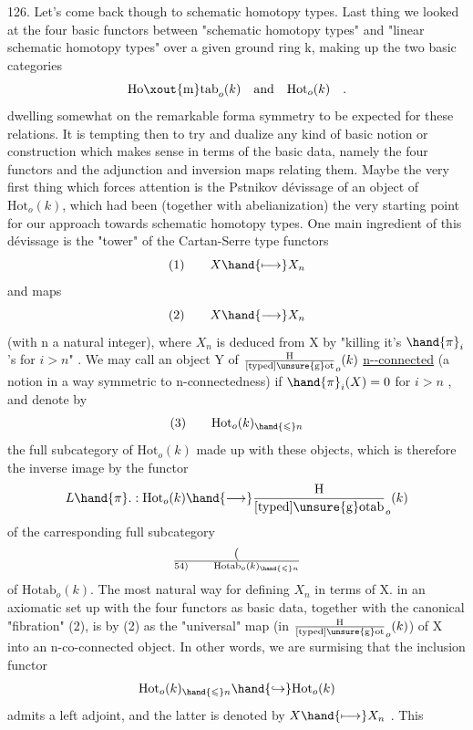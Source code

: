  

126.      Let's come back though to schematic homotopy types.  Last thing
we looked at  the four basic functors between "schematic homotopy
types"  and "linear schematic homotopy types" over a given ground ring k,
making up the two basic categories
\[ \mathrm{Ho\xout{m}tab}_o(k) \quad \text{and} \quad \mathrm{Hot}_o(k) \quad . \]
 dwelling somewhat on the remarkable forma symmetry to be expected
for these relations.  It  is tempting then to try and dualize any
kind of basic notion or construction which makes sense in terms of the
basic data,  namely the four functors and the adjunction and inversion
maps relating them.  Maybe the very first thing which forces attention
is the Pstnikov  dévissage of an object of $\mathrm{Hot}_o(k)$,  which
had been (together with abelianization) the very starting point for our
approach towards schematic homotopy types.   One main ingredient of this
dévissage is the "tower" of the Cartan-Serre type functors
\[ (1) \qquad X \hand{\longmapsto} X_n \]
and maps
\[ (2) \qquad X \hand{\longrightarrow} X_n \]
(with n a natural integer),  where $X_n$ is deduced from X by "killing it's
$\hand{\pi}_i$'s  for  $i > n$" .  We may  call an object Y of $\mathrm{H\over[typed]{\unsure{g}}{o}t}_o(k)$
\uline{n-}\uline{-connected}  (a notion in a way  symmetric to n-connectedness)
if  $\hand{\pi}_i(X) = 0$  for  $i > n$ ,  and denote by
\[ (3) \qquad \mathrm{Hot}_o(k)_{\hand{\leqslant} n} \]
the full subcategory of $\mathrm{Hot}_o(k)$ made up with these objects,  which is
therefore the inverse image by the functor
\[ L\hand{\pi}. : \mathrm{Hot}_o(k) \hand{\longrightarrow} \mathrm{H\over[typed]{\unsure{g}}{o}tab}_o(k) \]
of the carresponding full subcategory
\[ (\over{5}{4}) \qquad \mathrm{Hotab}_o(k)_{\hand{\leqslant} n} \]
of $\mathrm{Hotab}_o(k)$.  The most natural way for defining $X_n$ in terms of X. \hand{(}in
an axiomatic set up with the four functors as basic data,\hand{)}  together with
the canonical "fibration" (2),  is by  (2) as the "universal"
map (in $\mathrm{H\over[typed]{\unsure{g}}{o}t}_o(k)$)  of X into an  n-co-connected object.  In other words,
we are surmising  that the inclusion functor
\[ \mathrm{Hot}_o(k)_{\hand{\leqslant} n} \hand{\hookrightarrow} \mathrm{Hot}_o(k) \]
admits a left adjoint,  and the latter is denoted by  $X \hand{\longmapsto} X_n$ .   This


